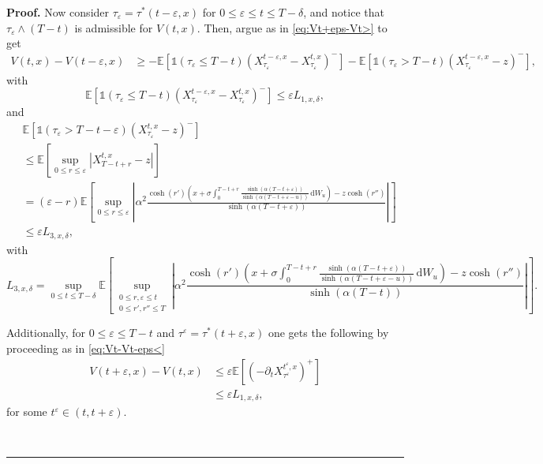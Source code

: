 \documentclass{tufte-handout}
\newcommand{\E}{\mathbb{E}} %
\newenvironment{pf}[1][Proof]{\textbf{#1.} }{\ \rule{0.5em}{0.5em}}
\begin{document}
\begin{pf}
		Now consider $\tau_\varepsilon = \tau^*(t - \varepsilon, x)$ for $0 \leq \varepsilon \leq t \leq T - \delta$, and notice that $\tau_\varepsilon\wedge(T - t)$ is admissible for $V(t, x)$. Then, argue as in \eqref{eq:Vt+eps-Vt>} to get
		\begin{align*}
		V(t, x) - V(t - \varepsilon, x)
		&\geq -\E\left[\mathbb{1}(\tau_\varepsilon\leq T - t)\left(X_{\tau_\varepsilon}^{t - \varepsilon, x} - X_{\tau_\varepsilon}^{t, x}\right)^-\right] - \E\left[\mathbb{1}(\tau_\varepsilon > T - t)\left(X_{\tau_\varepsilon}^{t - \varepsilon, x} - z\right)^-\right],
		\end{align*}
		with
		$$
		\E\left[\mathbb{1}(\tau_\varepsilon\leq T - t)\left(X_{\tau_\varepsilon}^{t - \varepsilon, x} - X_{\tau_\varepsilon}^{t, x}\right)^-\right] \leq \varepsilon L_{1, x, \delta},
		$$ 
		and
		\begin{align*}
		&\E\left[\mathbb{1}(\tau_\varepsilon > T - t - \varepsilon)\left(X_{\tau_\varepsilon}^{t, x} - z\right)^-\right] \\
		&\leq \E\left[\sup_{0 \leq r\leq \varepsilon}\left|X_{T - t + r}^{t, x} - z\right|\right] \\
		&= (\varepsilon - r)\E\left[\sup_{0 \leq r\leq \varepsilon}\left|\alpha^2\frac{\cosh(r')\left(x + \sigma\int_{0}^{T - t + r} \frac{\sinh(\alpha (T - t + \varepsilon))}{\sinh(\alpha (T - t + \varepsilon - u))}\,\mathrm{d}W_u\right) - z\cosh(r'')}{\sinh(\alpha (T - t + \varepsilon))}\right|\right] \\
		&\leq  \varepsilon L_{3, x, \delta},
		\end{align*}
		with
		$$
		L_{3, x, \delta} = \sup_{0\leq t\leq T - \delta} \E\left[\sup_{\substack{0 \leq r, \varepsilon\leq t \\ 0 \leq r', r''\leq T}}\left|\alpha^2\frac{\cosh(r')\left(x + \sigma\int_{0}^{T - t + r} \frac{\sinh(\alpha (T - t + \varepsilon))}{\sinh(\alpha (T - t + \varepsilon - u))}\,\mathrm{d}W_u\right) - z\cosh(r'')}{\sinh(\alpha (T - t))}\right|\right].
		$$
		
		Additionally, for $0 \leq \varepsilon \leq T - t $ and $\tau^\varepsilon = \tau^*(t + \varepsilon, x)$ one gets the following by proceeding as in \eqref{eq:Vt-Vt-eps<}
		\begin{align}
		V(t + \varepsilon, x) - V(t, x) 
		&\leq \varepsilon\E\left[\left(-\partial_tX_{\tau^\varepsilon}^{t^\varepsilon, x}\right)^+\right] \nonumber \\
		&\leq  \varepsilon L_{1, x, \delta},
		\end{align}
		for some $t^{\varepsilon}\in(t, t + \varepsilon)$.
	

\end{pf}
\end{document}
